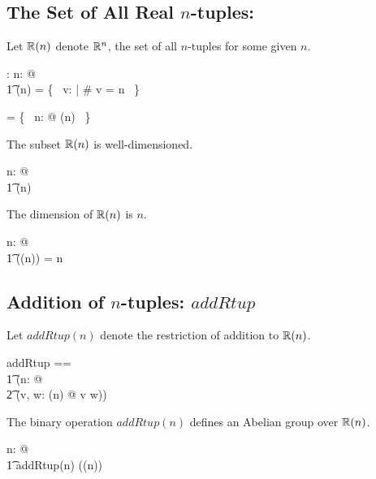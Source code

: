 \documentclass[11pt, oneside]{article}
\begin{document}
\subsection{The Set of All Real $n$-tuples: }

Let $\operatorname{\mathbb{R}}(n)$ denote $\mathbb{R}^n$, the set of all $n$-tuples for some given $n$.
\begin{axdef}
	\Rtup: \nat \fun \power \Rinf
\where
	\forall n: \nat @ \\
	\t1	\Rtup(n) = \{~ v: \Rinf | \# v = n ~\}
\end{axdef}

\begin{remark}

\begin{zed}
	\Rinf = \bigcup \{~ n: \nat @ \Rtup(n) ~\}
\end{zed}

\end{remark}

\begin{remark}
The subset $\operatorname{\mathbb{R}}(n)$ is well-dimensioned.

\begin{zed}
	\forall n: \nat @ \\
	\t1	\Rtup(n) \in \DeltaRinf
\end{zed}

\end{remark}

\begin{remark}
The dimension of $\operatorname{\mathbb{R}}(n)$ is $n$.

\begin{zed}
	\forall n: \nat @ \\
	\t1	\dimRinf(\Rtup(n)) = n
\end{zed}

\end{remark}

\subsection{Addition of $n$-tuples: $addRtup$}

Let $addRtup(n)$ denote the restriction of addition to $\operatorname{\mathbb{R}}(n)$.

\begin{zed}
addRtup == \\
\t1	(\lambda n: \nat @ \\
\t2		(\lambda v, w: \Rtup(n) @ v \addRinf w))
\end{zed}

\begin{example}
The binary operation $addRtup(n)$ defines an Abelian group over $\operatorname{\mathbb{R}}(n)$.

\begin{zed}
\forall n: \nat @ \\
\t1	addRtup(n) \in \abgroup(\Rtup(n))
\end{zed}

\end{example}
\end{document}

